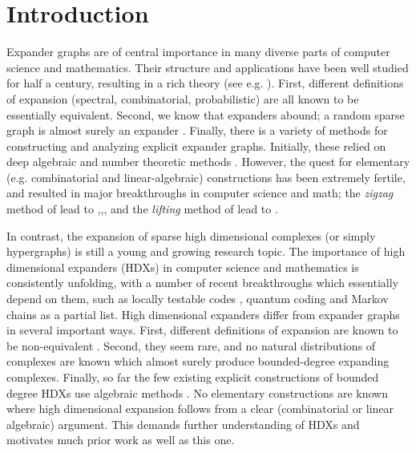 \setcounter{page}{1}
\section{Introduction}
Expander graphs are of central importance in many diverse parts of computer science and mathematics. Their structure and applications have been well studied for half a century, resulting in a rich theory (see e.g. \cite{hoory2006expander,lubotzky2012expander}). First, different definitions of expansion (spectral, combinatorial, probabilistic) are all known to be essentially equivalent. Second, we know that expanders abound; a random sparse graph is almost surely an expander \cite{pinsker1973complexity}. Finally, there is a variety of methods for constructing and analyzing explicit expander graphs. Initially, these relied on deep algebraic and number theoretic methods \cite{margulis1973explicit,gabber1981explicit,lubotzky1988ramanujan}. However, the quest for elementary (e.g. combinatorial and linear-algebraic) constructions has been extremely fertile, and resulted in major breakthroughs in computer science and math; the \emph{zigzag} method of \cite{reingold2000entropy} lead to \cite{dinur2007pcp},\cite{Reingold2008},\cite{TaShma2017explicit}, and the \emph{lifting} method of \cite{bilu2004constructing} lead to \cite{marcus2015interlacing,MarkusSS2015}.

In contrast, the expansion of sparse high dimensional complexes (or simply hypergraphs) is still a young and growing research topic. The importance of high dimensional expanders (HDXs) in computer science and mathematics is consistently unfolding, with a number of recent breakthroughs which essentially depend on them, such as locally testable codes \cite{dinur2022good,PanteleevK22}, quantum coding \cite{anshu2023nlts} and Markov chains \cite{AnariLOV2019} as a partial list. High dimensional expanders differ from expander graphs in several important ways. First, different definitions of expansion are known to be non-equivalent \cite{GundertW2016}. Second, they seem rare, and no natural distributions of complexes are known which almost surely produce bounded-degree expanding complexes. Finally, so far the few existing explicit constructions of bounded degree HDXs use algebraic methods \cite{Ballantine2000,CartwrightSZ2003,Li2004,LubotzkySV2005,KaufmanO2021,ODonnellP2022,Dikstein2023}. No elementary constructions
are known where high dimensional expansion follows from a clear (combinatorial or linear algebraic) argument. This demands further understanding of HDXs and motivates much prior work as well as this one.

